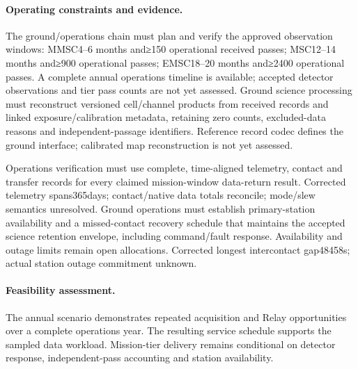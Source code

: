 \paragraph{Operating constraints and evidence.} 
The ground/operations chain must plan and verify the approved observation windows: MMSC4–6 months and≥150 operational received passes; MSC12–14 months and≥900 operational passes; EMSC18–20 months and≥2400 operational passes. A complete annual operations timeline is available; accepted detector observations and tier pass counts are not yet assessed.
Ground science processing must reconstruct versioned cell/channel products from received records and linked exposure/calibration metadata, retaining zero counts, excluded-data reasons and independent-passage identifiers. Reference record codec defines the ground interface; calibrated map reconstruction is not yet assessed.

Operations verification must use complete, time-aligned telemetry, contact and transfer records for every claimed mission-window data-return result. Corrected telemetry spans365days; contact/native data totals reconcile; mode/slew semantics unresolved.
Ground operations must establish primary-station availability and a missed-contact recovery schedule that maintains the accepted science retention envelope, including command/fault response. Availability and outage limits remain open allocations. Corrected longest intercontact gap48458s; actual station outage commitment unknown.

\paragraph{Feasibility assessment.} The annual scenario demonstrates repeated acquisition and Relay opportunities over a complete operations year. The resulting service schedule supports the sampled data workload. Mission-tier delivery remains conditional on detector response, independent-pass accounting and station availability.
